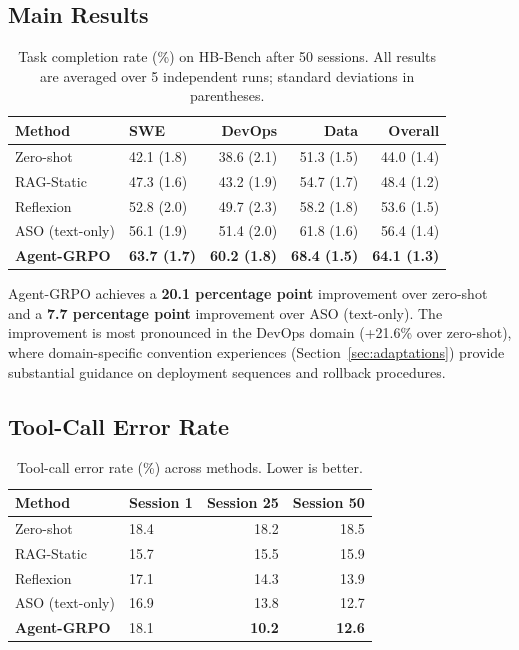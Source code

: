 \subsection{Main Results}

\begin{table}[H]
\centering
\caption{Task completion rate (\%) on HB-Bench after 50 sessions. All results
are averaged over 5 independent runs; standard deviations in parentheses.}
\label{tab:main-results}
\begin{tabularx}{\textwidth}{lXrrr}
\toprule
\textbf{Method} & \textbf{SWE} & \textbf{DevOps} & \textbf{Data} & \textbf{Overall} \\
\midrule
Zero-shot           & 42.1 (1.8) & 38.6 (2.1) & 51.3 (1.5) & 44.0 (1.4) \\
RAG-Static          & 47.3 (1.6) & 43.2 (1.9) & 54.7 (1.7) & 48.4 (1.2) \\
Reflexion           & 52.8 (2.0) & 49.7 (2.3) & 58.2 (1.8) & 53.6 (1.5) \\
ASO (text-only)     & 56.1 (1.9) & 51.4 (2.0) & 61.8 (1.6) & 56.4 (1.4) \\
\textbf{Agent-GRPO} & \textbf{63.7 (1.7)} & \textbf{60.2 (1.8)} & \textbf{68.4 (1.5)} & \textbf{64.1 (1.3)} \\
\bottomrule
\end{tabularx}
\end{table}

Agent-GRPO achieves a \textbf{20.1 percentage point} improvement over zero-shot
and a \textbf{7.7 percentage point} improvement over ASO (text-only). The
improvement is most pronounced in the DevOps domain (+21.6\% over zero-shot),
where domain-specific convention experiences (Section~\ref{sec:adaptations})
provide substantial guidance on deployment sequences and rollback procedures.

\subsection{Tool-Call Error Rate}

\begin{table}[H]
\centering
\caption{Tool-call error rate (\%) across methods. Lower is better.}
\label{tab:error-rate}
\begin{tabularx}{\textwidth}{lXrr}
\toprule
\textbf{Method} & \textbf{Session 1} & \textbf{Session 25} & \textbf{Session 50} \\
\midrule
Zero-shot           & 18.4 & 18.2 & 18.5 \\
RAG-Static          & 15.7 & 15.5 & 15.9 \\
Reflexion           & 17.1 & 14.3 & 13.9 \\
ASO (text-only)     & 16.9 & 13.8 & 12.7 \\
\textbf{Agent-GRPO} & 18.1 & \textbf{10.2} & \textbf{12.6} \\
\bottomrule
\end{tabularx}
\end{table}

